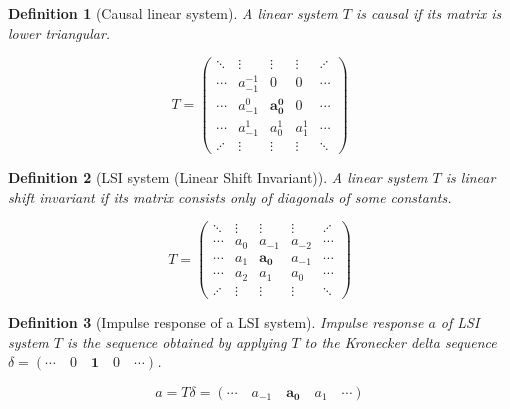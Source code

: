 \documentclass[a4paper]{article}
\theoremstyle{break}
\newtheorem{definition}{Definition}[section]
\theoremstyle{break}
\begin{document}
\begin{definition}[Causal linear system]
  A linear system $T$ is \textit{causal} if its matrix is lower triangular.

  \begin{equation*}
    T = \begin{pmatrix*}
          \ddots & \vdots & \vdots & \vdots & \iddots \\
          \cdots & a^{-1}_{-1} & 0 & 0 & \cdots \\
          \cdots & a^{0}_{-1} & \boldsymbol{a^{0}_{0}} & 0 & \cdots \\
          \cdots & a^{1}_{-1} & a^{1}_{0} & a^{1}_{1} & \cdots \\
          \iddots & \vdots & \vdots & \vdots & \ddots
        \end{pmatrix*}
  \end{equation*}
\end{definition}

\begin{definition}[LSI system (Linear Shift Invariant)]
  A linear system $T$ is \textit{linear shift invariant} if its matrix consists only of diagonals of some constants.

  \begin{equation*}
    T = \begin{pmatrix*}
          \ddots  & \vdots & \vdots             & \vdots & \iddots \\
          \cdots  & a_{0}  & a_{-1}             & a_{-2} & \cdots \\
          \cdots  & a_{1}  & \boldsymbol{a_{0}} & a_{-1} & \cdots \\
          \cdots  & a_{2}  & a_{1}              & a_{0}  & \cdots \\
          \iddots & \vdots & \vdots             & \vdots & \ddots
        \end{pmatrix*}
  \end{equation*}
\end{definition}

\begin{definition}[Impulse response of a LSI system]
  \textit{Impulse response $a$} of LSI system $T$ is the sequence obtained by applying $T$ to the Kronecker delta sequence $\delta = \left(\cdots \quad 0 \quad \boldsymbol{1} \quad 0 \quad \cdots\right)$.

  \begin{equation*}
    a = T \delta = \left( \cdots \quad a_{-1} \quad \boldsymbol{a_{0}} \quad a_{1} \quad \cdots \right)
  \end{equation*}
\end{definition}
\end{document}
